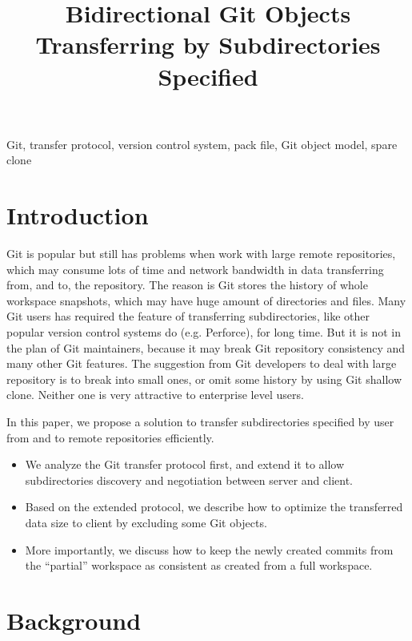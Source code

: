 \documentclass[copyrightwanted=false]{sigplanconf}
\begin{document}
\title{Bidirectional Git Objects Transferring by Subdirectories Specified}
\maketitle
\abstract{
    
}

\keywords
Git, transfer protocol, version control system, pack file, Git object model,
spare clone

\section{Introduction}
Git is popular but still has problems when work with large remote repositories,
which may consume lots of time and network bandwidth in data transferring from,
and to, the repository.
The reason is Git stores the history of whole workspace snapshots, which may
have huge amount of directories and files.
Many Git users has required the feature of transferring subdirectories, like
other popular version control systems do (e.g. Perforce), for long time.
But it is not in the plan of Git maintainers, because it may break Git
repository consistency and many other Git features\cite{roadmap}.
The suggestion from Git developers to deal with large repository is to break
into small ones, or omit some history by using Git shallow clone.
Neither one is very attractive to enterprise level users.

In this paper, we propose a solution to transfer subdirectories specified by
user from and to remote repositories efficiently.

\begin{itemize}
  \item We analyze the Git transfer protocol first, and extend it to allow
      subdirectories discovery and negotiation between server and client.

  \item Based on the extended protocol, we describe how to optimize the
      transferred data size to client by excluding some Git objects.

  \item More importantly, we discuss how to keep the newly created commits from
      the ``partial'' workspace as consistent as created from a full workspace.
\end{itemize}

\section{Background}
\end{document}
